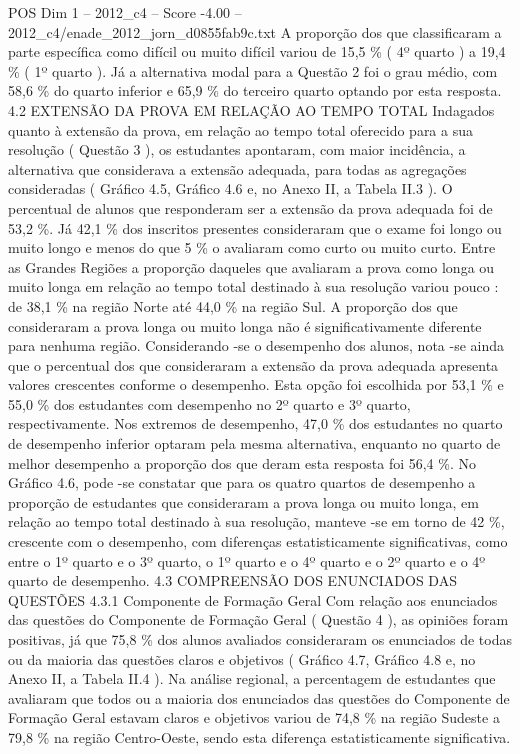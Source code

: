\begin{textsample}{POS Dim 1 – 2012\_c4 – Score -4.00 – 2012\_c4/enade\_2012\_jorn\_d0855fab9c.txt}
A proporção dos que classificaram a parte específica como difícil ou muito difícil variou de 15,5 \% ( 4º quarto ) a 19,4 \% ( 1º quarto ).
Já a alternativa modal para a Questão 2 foi o grau médio, com 58,6 \% do quarto inferior e 65,9 \% do terceiro quarto optando por esta resposta. 4.2 EXTENSÃO DA PROVA EM RELAÇÃO AO TEMPO TOTAL Indagados quanto à extensão da prova, em relação ao tempo total oferecido para a sua resolução ( Questão 3 ), os estudantes apontaram, com maior incidência, a alternativa que considerava a extensão adequada, para todas as agregações consideradas ( Gráfico 4.5, Gráfico 4.6 e, no Anexo II, a Tabela II.3 ).
O percentual de alunos que responderam ser a extensão da prova adequada foi de 53,2 \%.
Já 42,1 \% dos inscritos presentes consideraram que o exame foi longo ou muito longo e menos do que 5 \% o avaliaram como curto ou muito curto.
Entre as Grandes Regiões a proporção daqueles que avaliaram a prova como longa ou muito longa em relação ao tempo total destinado à sua resolução variou pouco : de 38,1 \% na região Norte até 44,0 \% na região Sul.
A proporção dos que consideraram a prova longa ou muito longa não é significativamente diferente para nenhuma região.
Considerando -se o desempenho dos alunos, nota -se ainda que o percentual dos que consideraram a extensão da prova adequada apresenta valores crescentes conforme o desempenho.
Esta opção foi escolhida por 53,1 \% e 55,0 \% dos estudantes com desempenho no 2º quarto e 3º quarto, respectivamente.
Nos extremos de desempenho, 47,0 \% dos estudantes no quarto de desempenho inferior optaram pela mesma alternativa, enquanto no quarto de melhor desempenho a proporção dos que deram esta resposta foi 56,4 \%.
No Gráfico 4.6, pode -se constatar que para os quatro quartos de desempenho a proporção de estudantes que consideraram a prova longa ou muito longa, em relação ao tempo total destinado à sua resolução, manteve -se em torno de 42 \%, crescente com o desempenho, com diferenças estatisticamente significativas, como entre o 1º quarto e o 3º quarto, o 1º quarto e o 4º quarto e o 2º quarto e o 4º quarto de desempenho. 4.3 COMPREENSÃO DOS ENUNCIADOS DAS QUESTÕES 4.3.1 Componente de Formação Geral Com relação aos enunciados das questões do Componente de Formação Geral ( Questão 4 ), as opiniões foram positivas, já que 75,8 \% dos alunos avaliados consideraram os enunciados de todas ou da maioria das questões claros e objetivos ( Gráfico 4.7, Gráfico 4.8 e, no Anexo II, a Tabela II.4 ).
Na análise regional, a percentagem de estudantes que avaliaram que todos ou a maioria dos enunciados das questões do Componente de Formação Geral estavam claros e objetivos variou de 74,8 \% na região Sudeste a 79,8 \% na região Centro-Oeste, sendo esta diferença estatisticamente significativa.

\end{textsample}
